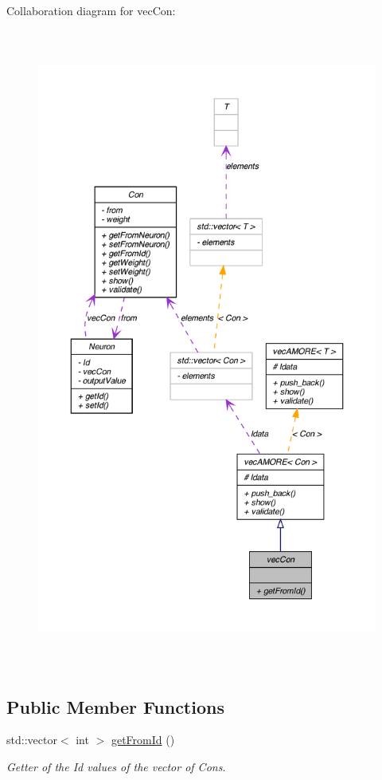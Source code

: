Collaboration diagram for vecCon:\nopagebreak
\begin{figure}[H]
\begin{center}
\leavevmode
\includegraphics[height=600pt]{classvec_con__coll__graph}
\end{center}
\end{figure}
\subsection*{Public Member Functions}
\begin{DoxyCompactItemize}
\item 
std::vector$<$ int $>$ \hyperlink{classvec_con_aa9f3f5df4c4060951c975c4c829b8471}{getFromId} ()
\begin{DoxyCompactList}\small\item\em Getter of the Id values of the vector of Cons. \end{DoxyCompactList}\end{DoxyCompactItemize}


